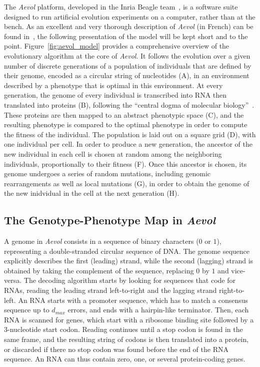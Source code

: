 The \emph{Aevol} platform, developed in the Inria Beagle team~\citep{rutten2019}, is a software suite designed to run artificial evolution experiments on a computer, rather than at the bench.
As an excellent and very thorough description of \emph{Aevol} (in French) can be found in~\cite{liard2020b}, the following presentation of the model will be kept short and to the point.
Figure~\ref{fig:aevol_model} provides a comprehensive overview of the evolutionary algorithm at the core of \emph{Aevol}.
It follows the evolution over a given number of discrete generations of a population of individuals that are defined by their genome, encoded as a circular string of nucleotides (A), in an environment described by a phenotype that is optimal in this environment.
At every generation, the genome of every individual is transcribed into RNA then translated into proteins (B), following the ``central dogma of molecular biology''~\citep{crick1958}.
These proteins are then mapped to an abstract phenotypic space (C), and the resulting phenotype is compared to the optimal phenotype in order to compute the fitness of the individual.
The population is laid out on a square grid (D), with one individual per cell.
In order to produce a new generation, the ancestor of the new individual in each cell is chosen at random among the neighboring individuals, proportionally to their fitness (F).
Once this ancestor is chosen, its genome undergoes a series of random mutations, including genomic rearrangements as well as local mutations (G), in order to obtain the genome of the new inidvidual in the cell at the next generation (H).

\subsection{The Genotype-Phenotype Map in \emph{Aevol}}

A genome in \emph{Aevol} consists in a sequence of binary characters ($0$ or $1$), representing a double-stranded circular sequence of DNA.
The genome sequence explicitly describes the first (leading) strand, while the second (lagging) strand is obtained by taking the complement of the sequence, replacing $0$ by $1$ and vice-versa.
The decoding algorithm starts by looking for sequences that code for RNAs, reading the leading strand left-to-right and the lagging strand right-to-left.
An RNA starts with a promoter sequence, which has to match a consensus sequence up to $d_{max}$ errors, and ends with a hairpin-like terminator.
Then, each RNA is scanned for genes, which start with a ribosome binding site followed by a 3-nucleotide start codon.
Reading continues until a stop codon is found in the same frame, and the resulting string of codons is then translated into a protein, or discarded if there no stop codon was found before the end of the RNA sequence.
An RNA can thus contain zero, one, or several protein-coding genes.

